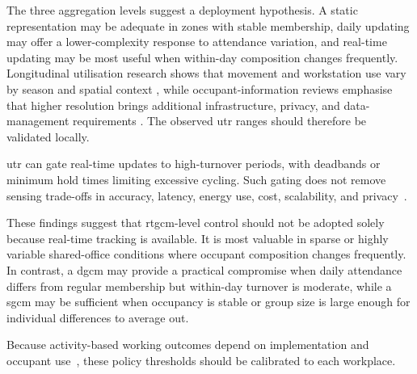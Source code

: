 The three aggregation levels suggest a deployment hypothesis.
A static representation may be adequate in zones with stable membership, daily updating may offer a lower-complexity response to attendance variation, and real-time updating may be most useful when within-day composition changes frequently.
Longitudinal utilisation research shows that movement and workstation use vary by season and spatial context \cite{gocer_overlaps_2022}, while occupant-information reviews emphasise that higher resolution brings additional infrastructure, privacy, and data-management requirements \cite{nagy_ten_2023,obrien_key_2020,zafari_survey_2019}.
The observed \ac{utr} ranges should therefore be validated locally.

\ac{utr} can gate real-time updates to high-turnover periods, with deadbands or minimum hold times limiting excessive cycling.
Such gating does not remove sensing trade-offs in accuracy, latency, energy use, cost, scalability, and privacy~\cite{zafari_survey_2019}.

These findings suggest that \ac{rtgcm}-level control should not be adopted solely because real-time tracking is available.
It is most valuable in sparse or highly variable shared-office conditions where occupant composition changes frequently.
In contrast, a \ac{dgcm} may provide a practical compromise when daily attendance differs from regular membership but within-day turnover is moderate, while a \ac{sgcm} may be sufficient when occupancy is stable or group size is large enough for individual differences to average out.

Because activity-based working outcomes depend on implementation and occupant use~\cite{marzban_review_2023}, these policy thresholds should be calibrated to each workplace.

